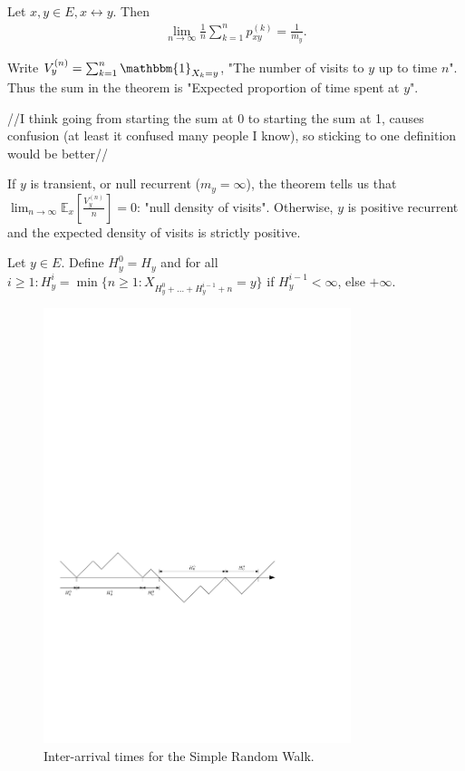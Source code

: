 \begin{theorem}[]
	Let $x,y \in E, x \leftrightarrow y$. Then 
	\begin{align}
	\boxed{\lim_{n \to \infty}\frac{1}{n}\sum_{k=1}^{n} p_{xy}^{(k)}=\frac{1}{m_{y}}}
	.\end{align}
\end{theorem}
\begin{rmk}[]
	Write $V_{y}^{(n)}=\sum_{k=1}^{n} \mathbbm{1}_{X_k=y}$, "The number of visits to $y$ up to time $n$". Thus the sum in the theorem is "Expected proportion of time spent at $y$".
\end{rmk}
{\color{blue} //I think going from starting the sum at 0 to starting the sum at 1, causes confusion (at least it confused many people I know), so sticking to one definition would be better//}

If $y$ is transient, or null recurrent ($m_y=\infty$), the theorem tells us that $\lim_{n \to \infty}\mathbb{E}_{x} \left[ \frac{V_y^{(n)}}{n} \right] =0$: "null density of visits". Otherwise, $y$ is positive recurrent and the expected density of visits is strictly positive.

\begin{defn}
	Let $y \in E$. Define $H_y^{0}=H_y$ and for all $i\geq 1: H_{y}^{i}= \min\{n \geq 1: X_{H_y^0 +  \ldots  + H_y^{i-1}+n}=y\}$ if $H_y^{i-1}<\infty$, else $+\infty$.	
\end{defn}
\begin{figure}[h!]
	\centering
	\includegraphics[width=0.8\textwidth]{figures/inter_arrival.pdf}
	\caption{Inter-arrival times for the Simple Random Walk.}
\end{figure}


